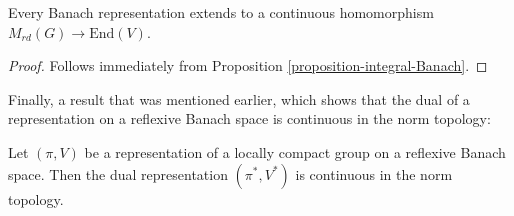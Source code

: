 \begin{proposition}
\label{proposition-rapiddecay-Banach}
Every Banach representation extends to a continuous homomorphism $M_{rd}(G)\to \text{End}(V)$. 
\end{proposition}

\begin{proof}
 Follows immediately from Proposition \ref{proposition-integral-Banach}.
\end{proof}

Finally, a result that was mentioned earlier, which shows that the dual of a representation on a reflexive Banach space is continuous in the norm topology:

\begin{proposition}
 \label{proposition-reflexive-dual}
Let $(\pi,V)$ be a representation of a locally compact group on a reflexive Banach space. Then the dual representation $(\pi^*, V^*)$ is continuous in the norm topology. 
\end{proposition}

